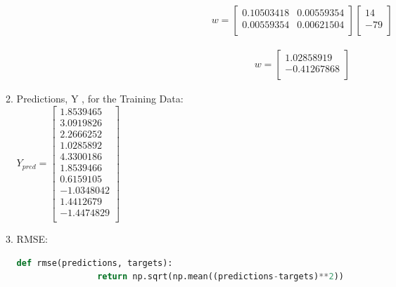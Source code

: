\documentclass[12pt]{article}
\begin{document}
\begin{enumerate}
\begin{enumerate}
\begin{equation}
	\begin{split}
		w = \begin{bmatrix}
			0.10503418 & 0.00559354\\
			0.00559354 & 0.00621504\\
		\end{bmatrix}\begin{bmatrix}
			14\\
			-79\\
		\end{bmatrix}
	\end{split}
\end{equation}

\begin{equation}
	\begin{split}
		w = \begin{bmatrix}
			1.02858919\\
			-0.41267868\\
		\end{bmatrix}
	\end{split}
\end{equation}

	
	\newpage
	
	\item Predictions, Y , for the Training Data:\\
	
	$
		Y_{pred}=
	\begin{bmatrix}
		1.8539465\\
		3.0919826\\	
		2.2666252\\
		1.0285892\\
		4.3300186\\
		1.8539466\\
		0.6159105\\
		-1.0348042\\
		1.4412679\\
		-1.4474829\\
	\end{bmatrix}
	$


	\item RMSE:\\
	
		\begin{lstlisting}[language=Python]
			def rmse(predictions, targets):
				return np.sqrt(np.mean((predictions-targets)**2))
				

\end{lstlisting}
\end{enumerate}
\end{enumerate}
\end{document}
